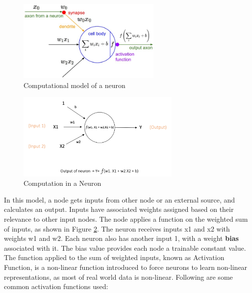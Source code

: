 \begin{figure}[h!]
\centering
\includegraphics[width=7cm]{figures/Neuron_Model.jpg}
\caption{Computational model of a neuron \cite{nn_stanford_1}}
\label{fig:cnn2}
\end{figure}

\begin{figure}[h!]
\centering
\includegraphics[width=8cm]{figures/Input_and_Output_to_a_Node.png}
\caption{Computation in a Neuron\cite{nn_karn}}
\label{fig:cnn3}
\end{figure}

In this model, a node gets inputs from other node or an external source, and calculates an output. Inputs have associated weights assigned based on their relevance to other input nodes. The node applies a function on the weighted sum of inputs, as shown in Figure \ref{fig:cnn3}.\newline\newline
The neuron receives inputs x1 and x2 with weights w1 and w2. Each neuron also has another input 1, with a weight \textbf{bias} associated with it. The bias value provides each node a trainable constant value.\newline\newline 
The function applied to the sum of weighted inputs, known as Activation Function, is a non-linear function introduced to force neurons to learn non-linear representations, as most of real world data is non-linear. Following are some common activation functions used:

